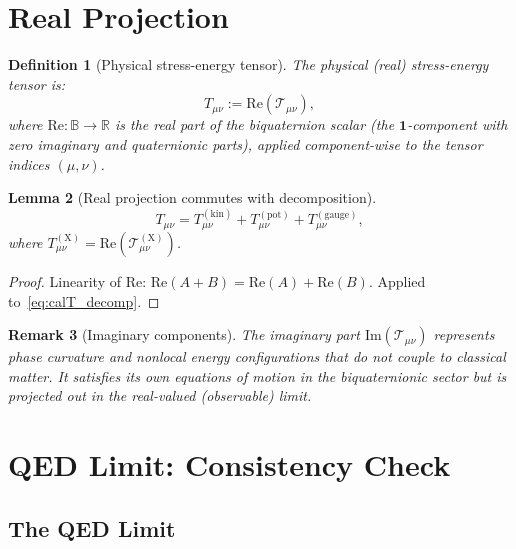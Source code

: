 \documentclass[12pt]{article}
\newtheorem{definition}{Definition}[section]
\newtheorem{lemma}[definition]{Lemma}
\newtheorem{remark}[definition]{Remark}
\newcommand{\re}{\mathrm{Re}}
\newcommand{\im}{\mathrm{Im}}
\begin{document}
\section{Real Projection}

\begin{definition}[Physical stress-energy tensor]
\label{def:real_T}
The \emph{physical (real) stress-energy tensor} is:
\begin{equation}
  \label{eq:T_real}
  T_{\mu\nu} := \re(\mathcal{T}_{\mu\nu}),
\end{equation}
where $\re: \mathbb{B} \to \mathbb{R}$ is the real part of the biquaternion
scalar (the $\mathbf{1}$-component with zero imaginary and quaternionic
parts), applied component-wise to the tensor indices $(\mu,\nu)$.
\end{definition}

\begin{lemma}[Real projection commutes with decomposition]
\label{lem:re_commutes}
\begin{equation}
  T_{\mu\nu}
  = T^{(\mathrm{kin})}_{\mu\nu}
  + T^{(\mathrm{pot})}_{\mu\nu}
  + T^{(\mathrm{gauge})}_{\mu\nu},
\end{equation}
where $T^{(\mathrm{X})}_{\mu\nu} = \re(\mathcal{T}^{(\mathrm{X})}_{\mu\nu})$.
\end{lemma}

\begin{proof}
  Linearity of $\re$: $\re(A+B) = \re(A) + \re(B)$.
  Applied to~\eqref{eq:calT_decomp}.
\end{proof}

\begin{remark}[Imaginary components]
  The imaginary part $\im(\mathcal{T}_{\mu\nu})$ represents phase curvature
  and nonlocal energy configurations that do not couple to classical matter.
  It satisfies its own equations of motion in the biquaternionic sector but
  is projected out in the real-valued (observable) limit.
\end{remark}

\section{QED Limit: Consistency Check}
\label{sec:qed}

\subsection{The QED Limit}
\end{document}

